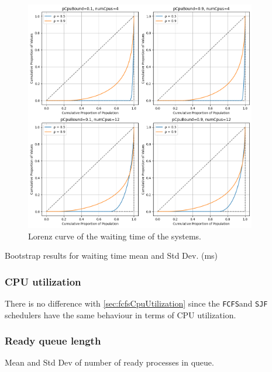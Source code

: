 \begin{figure}[H]
    \captionsetup{type=figure}
    \centering
    \includegraphics[width=0.9\textwidth]{./images/04/sjf/wait/lorenz.png}
    \caption{Lorenz curve of the waiting time of the systems.}
    \label{fig:sjfWaitLorenz}
\end{figure}


\begin{table}[H]
    \centering
    \scriptsize
    
    \caption{Bootstrap results for waiting time mean and Std Dev. (ms)}
    \label{tab:sjfWait}
\end{table}


\subsubsection{CPU utilization}

There is no difference with \cref{sec:fcfsCpuUtilization} since the \texttt{FCFS}and \texttt{SJF} schedulers have the same behaviour in terms of CPU utilization.

\subsubsection{Ready queue length}

\begin{table}[H]
    \centering
    \scriptsize
    
    \caption{Mean and Std Dev of number of ready processes in queue.}
    \label{tab:sjfReadyProc}
\end{table}
